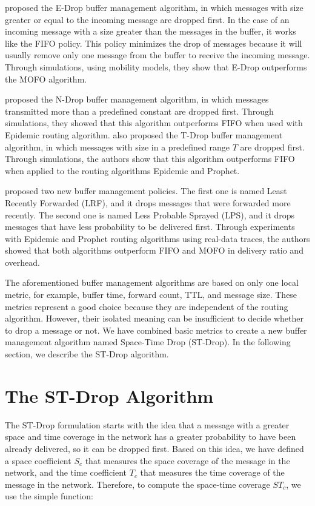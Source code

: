 \citet{rashid2011drop} proposed the E-Drop buffer management algorithm, in which messages with size greater or equal to the incoming message are dropped first. In the case of an incoming message with a size greater than the messages in the buffer, it works like the FIFO policy. This policy minimizes the drop of messages because it will usually remove only one message from the buffer to receive the incoming message. Through simulations, using mobility models, they show that E-Drop
outperforms the MOFO algorithm.

\citet{li2009n} proposed the N-Drop buffer management algorithm, in which messages transmitted more than a predefined constant are dropped first. Through simulations, they showed that this algorithm outperforms FIFO when used with Epidemic routing algorithm. \citet{ayub2010t} also proposed the T-Drop buffer management algorithm, in which
messages with size in a predefined range $T$ are dropped first. Through simulations, the authors show that this algorithm outperforms FIFO when applied to the routing algorithms Epidemic and Prophet.

\citet{naves2012lps} proposed two new buffer management policies. The first one is named Least Recently Forwarded (LRF), and it drops messages that were forwarded more recently. The second one is named Less Probable Sprayed (LPS), and it drops messages that have less probability to be delivered first. Through experiments with Epidemic and Prophet
routing algorithms using real-data traces, the authors showed that both algorithms outperform FIFO and MOFO in delivery ratio and overhead.

The aforementioned buffer management algorithms are based on only one local metric, for example, buffer time, forward count, TTL, and message size. These metrics represent a good choice because they are independent of the routing algorithm. However, their isolated meaning can be insufficient to decide whether to drop a message or not. We have combined basic metrics to create a new buffer management algorithm named Space-Time Drop (ST-Drop). In the following section, we describe the ST-Drop algorithm.

\section{The ST-Drop Algorithm}
\label{sce:stDrop}

The ST-Drop formulation starts with the idea that a message with a greater space and time coverage in the network has a greater probability to have been already delivered, so it can be dropped first. Based on this idea, we have defined a space coefficient $S_{c}$ that measures the space coverage of the message in the network, and the time coefficient $T_{c}$ that measures the time coverage of the message in the network. Therefore, to compute the space-time coverage $ST_{c}$, we use the simple function:

